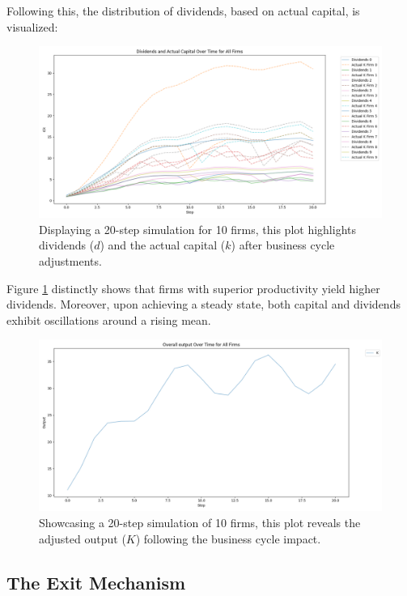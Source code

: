 \documentclass[12pt]{report}
\begin{document}
Following this, the distribution of dividends, based on actual capital, is visualized:
\begin{figure}[H]
    \centering
    \includegraphics[scale=0.4]{figure/div_cap_noexit.png}
    \caption{Displaying a 20-step simulation for 10 firms, this plot highlights dividends (\( d \)) and the actual capital
    (\(k\)) after business cycle
     adjustments.}
    \label{fig:divNoExit}
\end{figure}

Figure \ref{fig:divNoExit} distinctly shows that firms with superior productivity yield higher dividends. Moreover, upon
achieving a steady state, both capital and dividends exhibit oscillations around a rising mean. 
\begin{figure}[H]
    \centering
    \includegraphics[scale=0.4]{figure/Output_noexit.png}
    \caption{Showcasing a 20-step simulation of 10 firms, this plot reveals the adjusted output (\( K \)) following the business cycle impact.}
    \label{fig:OutNoExit}
\end{figure}


\subsection{The Exit Mechanism}
\end{document}
